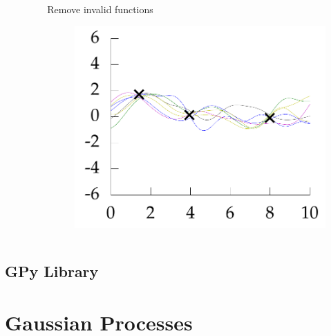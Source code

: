 \documentclass[10pt]{beamer}
\begin{document}
\begin{frame}
\begin{columns}
\begin{column}{0.33\textwidth}
\begin{figure}
        \end{figure}
      \end{column}
      \pause
      \begin{column}{0.33\textwidth}
        Remove invalid functions
        \begin{figure}
          \centering
          \includegraphics[width=\textwidth]{func3.png}
        \end{figure}
      \end{column}
    \end{columns}
  \end{frame}

  \subsection{GPy Library}

  \section{Gaussian Processes}
\end{document}
